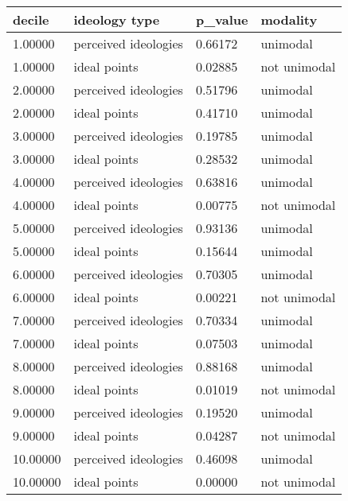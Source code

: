 \begin{table}
\centering
\begin{tabular}[t]{llll}
\toprule
decile & ideology type & p\_value & modality\\
\midrule
1.00000 & perceived ideologies & 0.66172 & unimodal\\
1.00000 & ideal points & 0.02885 & not unimodal\\
2.00000 & perceived ideologies & 0.51796 & unimodal\\
2.00000 & ideal points & 0.41710 & unimodal\\
3.00000 & perceived ideologies & 0.19785 & unimodal\\
3.00000 & ideal points & 0.28532 & unimodal\\
4.00000 & perceived ideologies & 0.63816 & unimodal\\
4.00000 & ideal points & 0.00775 & not unimodal\\
5.00000 & perceived ideologies & 0.93136 & unimodal\\
5.00000 & ideal points & 0.15644 & unimodal\\
6.00000 & perceived ideologies & 0.70305 & unimodal\\
6.00000 & ideal points & 0.00221 & not unimodal\\
7.00000 & perceived ideologies & 0.70334 & unimodal\\
7.00000 & ideal points & 0.07503 & unimodal\\
8.00000 & perceived ideologies & 0.88168 & unimodal\\
8.00000 & ideal points & 0.01019 & not unimodal\\
9.00000 & perceived ideologies & 0.19520 & unimodal\\
9.00000 & ideal points & 0.04287 & not unimodal\\
10.00000 & perceived ideologies & 0.46098 & unimodal\\
10.00000 & ideal points & 0.00000 & not unimodal\\
\bottomrule
\end{tabular}
\end{table}
